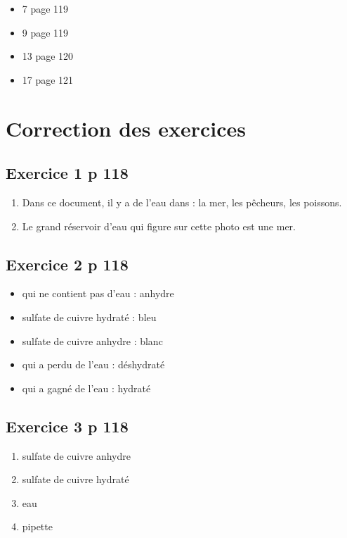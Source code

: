 \documentclass[12pt,a4paper]{article}
\begin{document}
\begin{myexos}
	\begin{multicols}{2}
		\begin{itemize}
			\item 7 page 119
			\item 9 page 119
			\item 13 page 120
			\item 17 page 121
		\end{itemize}
	\end{multicols}
\end{myexos}
\appendix

\newpage

\section*{Correction des exercices}

\subsection*{Exercice 1 p 118}

\begin{enumerate}[label=\alph*)]
	\item Dans ce document, il y a de l'eau dans : la mer, les pêcheurs, les poissons.
	\item Le grand réservoir d'eau qui figure sur cette photo est une mer.
\end{enumerate}

\subsection*{Exercice 2 p 118}

\begin{multicols}{2}
	\begin{itemize}
		\item qui ne contient pas d'eau : anhydre
		\item sulfate de cuivre hydraté : bleu
		\item sulfate de cuivre anhydre : blanc
		\item qui a perdu de l'eau : déshydraté
		\item qui a gagné de l'eau : hydraté
	\end{itemize}
\end{multicols}

\subsection*{Exercice 3 p 118}
\begin{multicols}{2}
	\begin{enumerate}[label=\arabic*)]
		\item sulfate de cuivre anhydre
		\item sulfate de cuivre hydraté
		\item eau
		\item pipette
	\end{enumerate}
\end{multicols}
\end{document}
